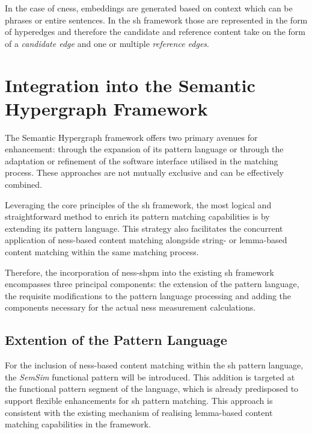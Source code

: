 \documentclass[11pt]{scrreprt}
\begin{document}
In the case of \gls{cness}, embeddings are generated based on context which can be phrases or entire sentences. In the \gls{sh} framework those are represented in the form of hyperedges and therefore the candidate and reference content take on the form of a \textit{candidate edge} and one or multiple \textit{reference edges}. 

\section{Integration into the Semantic Hypergraph Framework}

The Semantic Hypergraph framework offers two primary avenues for enhancement: through the expansion of its pattern language or through the adaptation or refinement of the software interface utilised in the matching process. These approaches are not mutually exclusive and can be effectively combined.

Leveraging the core principles of the \gls{sh} framework, the most logical and straightforward method to enrich its pattern matching capabilities is by extending its pattern language. This strategy also facilitates the concurrent application of \gls{ness}-based content matching alongside string- or lemma-based content matching within the same matching process.

Therefore, the incorporation of \gls{ness-shpm} into the existing \gls{sh} framework encompasses three principal components: the extension of the pattern language, the requisite modifications to the pattern language processing and adding the components necessary for the actual \gls{ness} measurement calculations.

\newpage

\subsection{Extention of the Pattern Language}
\label{sec:extension-pattern-language}
For the inclusion of \gls{ness}-based content matching within the \gls{sh} pattern language, the \textit{SemSim} functional pattern will be introduced. This addition is targeted at the functional pattern segment of the language, which is already predisposed to support flexible enhancements for \gls{sh} pattern matching. This approach is consistent with the existing mechanism of realising lemma-based content matching capabilities in the framework.
\end{document}
